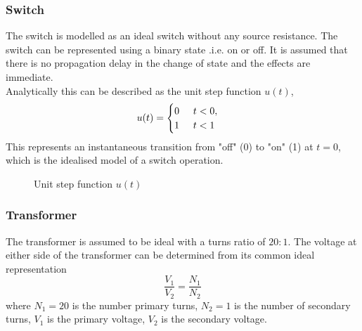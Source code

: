 \subsubsection{Switch} The switch is modelled as an ideal switch without any source resistance. The switch can be represented using a binary state .i.e. on or off. It is assumed that there is no propagation delay in the change of state and the effects are immediate. \\

Analytically this can be described as the unit step function $u(t)$,
\begin{equation}
	u(t) = \begin{cases}
		0 \hspace{0.5cm} t < 0, \\
		1 \hspace{0.5cm} t < 1
	\end{cases}
	\label{eq:unit_step_function}
\end{equation}
This represents an instantaneous transition from "off" (0) to "on" (1) at $t=0$, which is the idealised model of a switch operation. 

\begin{figure}[H]
\centering	
{}
\caption{Unit step function $u(t)$}
\end{figure}

\subsubsection{Transformer} The transformer is assumed to be ideal with a turns ratio of $20:1$. The voltage at either side of the transformer can be determined from its common ideal representation
\begin{equation}
    \frac{V_1}{V_2} = \frac{N_1}{N_2}
    \label{eq:ideal_transformer}
\end{equation}
where $N_1=20$ is the number primary turns, $N_2=1$ is the number of secondary turns, $V_1$ is the primary voltage, $V_2$ is the secondary voltage.\\

